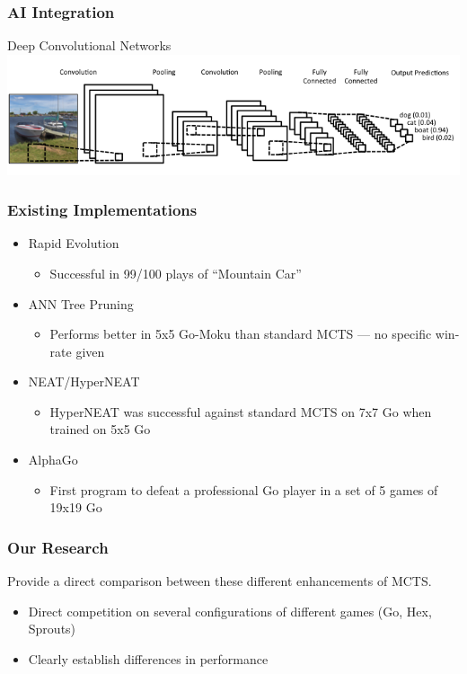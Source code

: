 \documentclass{beamer}
\begin{document}
\begin{frame}
\frametitle{AI Integration}
\vspace{-0.25in}
\begin{center}
Deep Convolutional Networks\\
\includegraphics[scale=.4]{images/cnnfull.png}
\end{center}
\end{frame}

\begin{frame}
\frametitle{Existing Implementations}
\begin{itemize}
 \item Rapid Evolution
\begin{itemize}
 \item Successful in 99/100 plays of ``Mountain Car''
\end{itemize}
%
 \item ANN Tree Pruning
\begin{itemize}
 \item Performs better in 5x5 Go-Moku than standard MCTS --- no specific win-rate given
\end{itemize}
%
 \item NEAT/HyperNEAT
\begin{itemize}
 \item HyperNEAT was successful against standard MCTS on 7x7 Go when trained on 5x5 Go
\end{itemize}
%
 \item AlphaGo
\begin{itemize}
 \item First program to defeat a professional Go player in a set of 5 games of 19x19 Go
\end{itemize}
\end{itemize}
\end{frame}

\begin{frame}
\frametitle{Our Research}
Provide a direct comparison between these different enhancements of MCTS.
\begin{itemize}
\item Direct competition on several configurations of different games (Go, Hex, Sprouts)
\item Clearly establish differences in performance
\end{itemize}
\end{frame}
\end{document}
